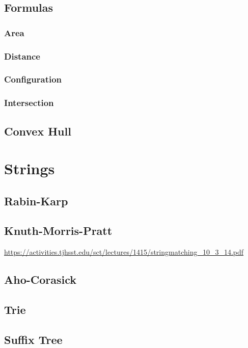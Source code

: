 \documentclass[11pt]{book}
\begin{document}
\section{Formulas}

\subsection{Area}

\subsection{Distance}

\subsection{Configuration}

\subsection{Intersection}

\section{Convex Hull}

\chapter{Strings}

\section{Rabin-Karp}

\section{Knuth-Morris-Pratt}

\url{https://activities.tjhsst.edu/sct/lectures/1415/stringmatching_10_3_14.pdf}

\section{Aho-Corasick}

\section{Trie}

\section{Suffix Tree}
\end{document}
